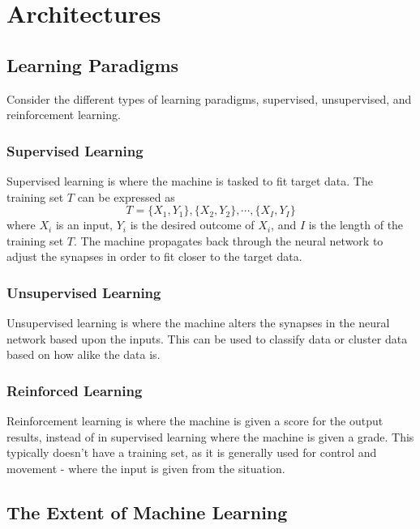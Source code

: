 

\section{Architectures}
\label{discuss}

\subsection{Learning Paradigms}
\label{paradigms}

Consider the different types of learning paradigms, supervised, unsupervised, and reinforcement learning.

\subsubsection{Supervised Learning}
\label{supervised}

Supervised learning is where the machine is tasked to fit target data. The training set $T$ can be expressed as $$T=\{X_1, Y_1\},\{X_2, Y_2\},\cdots,\{X_I, Y_I\}$$ where $X_i$ is an input, $Y_i$ is the desired outcome of $X_i$, and $I$ is the length of the training set $T$. The machine propagates back through the neural network to adjust the synapses in order to fit closer to the target data.

\subsubsection{Unsupervised Learning}
\label{unsupervised}

Unsupervised learning is where the machine alters the synapses in the neural network based upon the inputs. This can be used to classify data or cluster data based on how alike the data is.

\subsubsection{Reinforced Learning}
\label{reinforced}

Reinforcement learning is where the machine is given a score for the output results, instead of in supervised learning where the machine is given a grade. This typically doesn't have a training set, as it is generally used for control and movement - where the input is given from the situation.

\subsection{The Extent of Machine Learning}
\label{extent}

